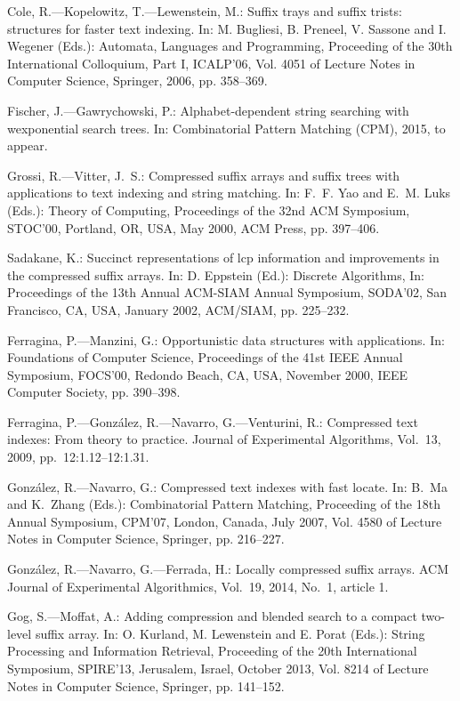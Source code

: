 \documentclass{cai}
\begin{document}
\begin{thebibliography}{99}
Cole, R.---Kopelowitz, T.---Lewenstein, M.: Suffix trays and suffix trists:
  structures for faster text indexing. 
  In: M. Bugliesi, B. Preneel, V. Sassone and I. Wegener (Eds.):
  Automata, Languages and Programming,
  Proceeding of the 30th International Colloquium, Part I, ICALP'06,
  Vol. 4051 of Lecture Notes in Computer Science,
  Springer, 2006, pp. 358--369.

Fischer, J.---Gawrychowski, P.: Alphabet-dependent string searching with
  wexponential search trees. In: Combinatorial Pattern Matching (CPM), 2015, to appear.

Grossi, R.---Vitter, J.~S.: Compressed suffix arrays and suffix trees with
  applications to text indexing and string matching. 
  In: F.~F. Yao and E.~M. Luks (Eds.):
  Theory of Computing,
  Proceedings of the 32nd ACM Symposium, STOC'00, Portland, OR, USA, May 2000,
  ACM Press, pp. 397--406.

Sadakane, K.: Succinct representations of lcp information and improvements in
  the compressed suffix arrays. 
  In: D. Eppstein (Ed.):
  Discrete Algorithms,
  In: Proceedings of the 13th Annual ACM-SIAM Annual Symposium, SODA'02, San Francisco, CA, USA, January 2002,
  ACM/SIAM, pp. 225--232.

Ferragina, P.---Manzini, G.: Opportunistic data structures with applications. 
  In: Foundations of Computer Science,
  Proceedings of the 41st IEEE Annual Symposium, FOCS'00, Redondo Beach, CA, USA, November 2000,
  IEEE Computer Society, pp. 390--398.

Ferragina, P.---Gonz{\'a}lez, R.---Navarro, G.---Venturini, R.: Compressed text
  indexes: From theory to practice. Journal of Experimental Algorithms, Vol.~13, 2009, pp.~12:1.12--12:1.31.

Gonz{\'a}lez, R.---Navarro, G.: Compressed text indexes with fast locate. 
  In: B.~Ma and K.~Zhang (Eds.):
  Combinatorial Pattern Matching,
  Proceeding of the 18th Annual Symposium, CPM'07, London, Canada, July 2007,
  Vol. 4580 of Lecture Notes in Computer Science, Springer, pp. 216--227.

Gonz{\'a}lez, R.---Navarro, G.---Ferrada, H.: Locally compressed suffix arrays. 
  ACM Journal of Experimental Algorithmics, Vol.~19, 2014, No.~1, article 1.

Gog, S.---Moffat, A.: Adding compression and blended search to a compact two-level
  suffix array.
  In: O. Kurland, M. Lewenstein and E. Porat (Eds.):  
  String Processing and Information Retrieval, 
  Proceeding of the 20th International Symposium, SPIRE'13, Jerusalem, Israel, October 2013,
  Vol. 8214 of Lecture Notes in Computer Science, Springer, pp. 141--152.


\end{thebibliography}
\end{document}
